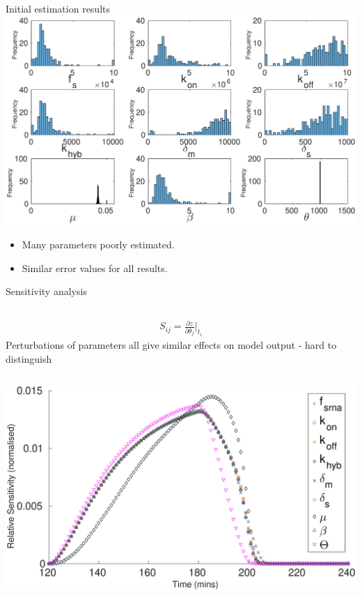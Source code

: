 \documentclass{beamer}
\begin{document}
\begin{frame}{Initial estimation results}
  \includegraphics[scale = 0.27, clip = true, trim = 100 0 0 40]{Figures/13_9_hist}
  \vspace{-10mm}
        \begin{itemize}
            \item Many parameters poorly estimated.
    \item Similar error values for all results.
            \end{itemize}
\end{frame}

\begin{frame}{Sensitivity analysis}
\begin{columns}
 \LARGE
\begin{align*}
S_{ij} =  \frac{\partial z}{ \partial \theta_{j}}\Bigr|_{t_{i}}
\end{align*}
\normalsize
{}
Perturbations of parameters all give similar effects on model output - \alert{hard to distinguish}
\end{columns}
  \includegraphics[scale = 0.25, clip = true, trim = 00 0 0 0]{Figures/Sensitivty_scaled_other}
\end{frame}
\end{document}
